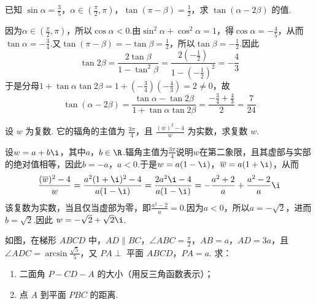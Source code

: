 \documentclass[UTF8,a4paper,oneside,11pt]{ctexbook}
\begin{document}
\begin{problem}
已知 \(\sin \alpha = \frac{3}{5}\)，\(\alpha \in \left(\frac{\pi}{2}, \pi\right)\)，\(\tan(\pi - \beta) = \frac{1}{2}\)，求 \(\tan(\alpha - 2\beta)\) 的值.
\end{problem}

\begin{solution}
因为\(\alpha\in\left(\frac{\pi}{2},\pi\right)\)，所以\(\cos\alpha<0\).由\(\sin^2\alpha+\cos^2\alpha=1\)，得\(\cos\alpha=-\frac{4}{5}\)，从而\(\tan\alpha=-\frac{3}{4}\).又\(\tan(\pi-\beta)=-\tan\beta=\frac{1}{2}\)，所以\(\tan\beta=-\frac{1}{2}\).因此
\[
\tan2\beta=\frac{2\tan\beta}{1-\tan^2\beta}=\frac{2\left(-\frac{1}{2}\right)}{1-\left(-\frac{1}{2}\right)^2}=-\frac{4}{3}
\]
于是分母\(1+\tan\alpha\tan2\beta=1+\left(-\frac{3}{4}\right)\left(-\frac{4}{3}\right)=2\ne0\)，故
\[
\tan(\alpha-2\beta)=\frac{\tan\alpha-\tan2\beta}{1+\tan\alpha\tan2\beta}=\frac{-\frac{3}{4}+\frac{4}{3}}{2}=\frac{7}{24}
\]
\end{solution}

\begin{problem}
设 \(w\) 为复数. 它的辐角的主值为 \(\frac{3\pi}{4}\)，且 \(\frac{\left(\overline{w}\right)^2 - 4}{w}\) 为实数，求复数 \(w\).
\end{problem}

\begin{solution}
设\(w=a+b\i\)，其中\(a\)，\(b\in\R\).辐角主值为\(\frac{3\pi}{4}\)说明\(w\)在第二象限，且其虚部与实部的绝对值相等，因此\(b=-a\)，\(a<0\).于是\(w=a(1-\i)\)，\(\overline w=a(1+\i)\)，从而
\[
\frac{(\overline w)^2-4}{w}=\frac{a^2(1+\i)^2-4}{a(1-\i)}=\frac{2a^2\i-4}{a(1-\i)}=-\frac{a^2+2}{a}+\frac{a^2-2}{a}\i
\]
该复数为实数，当且仅当虚部为零，即\(\frac{a^2-2}{a}=0\).因为\(a<0\)，所以\(a=-\sqrt2\)，进而\(b=\sqrt2\).因此
\(w=-\sqrt2+\sqrt2\i\).
\end{solution}

\begin{problem}
如图，在梯形 \(ABCD\) 中，\(AD \parallel BC\)，\(\angle ABC = \frac{\pi}{2}\)，\(AB = a\)，\(AD = 3a\)，且 \(\angle ADC = \arcsin \frac{\sqrt{5}}{5}\)，又 \(PA \perp\) 平面 \(ABCD\)，\(PA = a\). 求：
\begin{enumerate}
\item 二面角 \(P-CD-A\) 的大小（用反三角函数表示）；
\item 点 \(A\) 到平面 \(PBC\) 的距离.
\end{enumerate}

\end{problem}
\end{document}
